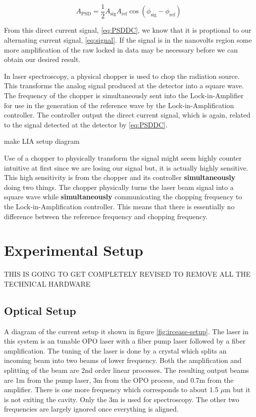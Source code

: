 \documentclass[11pt,a4paper]{book}
\begin{document}
		\begin{equation}
			\label{eq:PSDDC}
			A_{\text{PSD}} = \dfrac{1}{2} A_{\text{sig}} A_{\text{ref}} \cos(\phi_{\text{sig}} - \phi_{\text{ref}})
		\end{equation}		
		
		\noindent
		From this direct current signal, \autoref{eq:PSDDC}, we know that it is proptional to our alternating current signal, \autoref{eq:signal}. If the signal is in the nanovolts region some more amplification of the raw locked in  data may be necessary before we can obtain our desired result. \cite{LIA}
		
		In laser spectroscopy, a physical chopper is used to chop the radiation source. This transforms the analog signal produced at the detector into a square wave. The frequency of the chopper is simultaneously sent into the Lock-in-Amplifier for use in the generation of the reference wave by the Lock-in-Amplification controller. The controller output the direct current signal, which is again, related to the signal detected at the detector by \autoref{eq:PSDDC}. 
		
		make LIA setup diagram
		
		Use of a chopper to physically transform the signal might seem highly counter intuitive at first since we are losing our signal but, it is actually highly sensitive. This high sensitivity is from the chopper and its controller \textbf{simultaneously} doing two things. The chopper physically turns the laser beam signal into a square wave while \textbf{simultaneously} communicating the chopping frequency to the Lock-in-Amplification controller. This means that there is essentially no difference between the reference frequency and chopping frequency.
		
\chapter{Experimental Setup}
	THIS IS GOING TO GET COMPLETELY REVISED TO REMOVE ALL THE TECHNICAL HARDWARE
	\section{Optical Setup}
		A diagram of the current setup it shown in figure \autoref{fig:ircease-setup}.
		The laser in this system is an tunable OPO laser with a fiber pump laser followed by a fiber amplification. The tuning of the laser is done by a crystal which splits an incoming beam into two beams of lower frequency. Both the amplification and splitting  of the beam are 2nd order linear processes. 
		The resulting output beams are 1\text{$\mu$}m from the pump laser, 3\text{$\mu$}m from the OPO process, and 0.7\text{$\mu$}m from the amplifier. There is one more frequency which corresponds to about 1.5 $\mu$m but it is not exiting the cavity. Only the 3\text{$\mu$}m  is used for spectroscopy. The other two frequencies are largely ignored once everything is aligned. 
		
\end{document}
